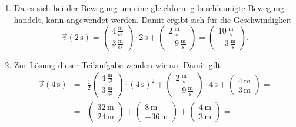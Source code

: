 \begin{MExercises}
\begin{MExercise}
     
     \begin{MSolution} 
     \begin{enumerate}
     \item Da es sich bei der Bewegung um eine gleichf\"ormig beschleunigte Bewegung handelt, kann  angewendet werden. Damit ergibt sich f\"ur die Geschwindigkeit
     \begin{equation*}
     \vec{v}(2\,\text{s})=\left(\begin{array}{c} 4\,\frac{\text{m}}{\text{s}^2} \\ 3\,\frac{\text{m}}{\text{s}^2} \end{array}\right)\cdot 2\,\text{s}+\left(\begin{array}{c} 2\,\frac{\text{m}}{\text{s}} \\ -9\,\frac{\text{m}}{\text{s}} \end{array}\right)=\left(\begin{array}{c} 10\,\frac{\text{m}}{\text{s}} \\ -3\,\frac{\text{m}}{\text{s}} \end{array}\right).
     \end{equation*}
     \item Zur L\"osung dieser Teilaufgabe wenden wir  an. Damit gilt
     \begin{eqnarray*}
          \vec{s}(4\,\text{s})&=&\frac{1}{2}\left(\begin{array}{c} 4\,\frac{\text{m}}{\text{s}^2} \\ 3\,\frac{\text{m}}{\text{s}^2} \end{array}\right)\cdot \left(4\,\text{s}\right)^2+\left(\begin{array}{c} 2\,\frac{\text{m}}{\text{s}} \\ -9\,\frac{\text{m}}{\text{s}} \end{array}\right)\cdot4\,\text{s}+\left(\begin{array}{c} 4\,\text{m} \\ 3\,\text{m} \end{array}\right)=\\
          &=&\left(\begin{array}{c} 32\,\text{m} \\ 24\,\text{m} \end{array}\right)+\left(\begin{array}{c} 8\,\text{m} \\ -36\,\text{m} \end{array}\right)+\left(\begin{array}{c} 4\,\text{m} \\ 3\,\text{m} \end{array}\right)=\\

\end{eqnarray*}
\end{enumerate}
\end{MSolution}
\end{MExercise}
\end{MExercises}
